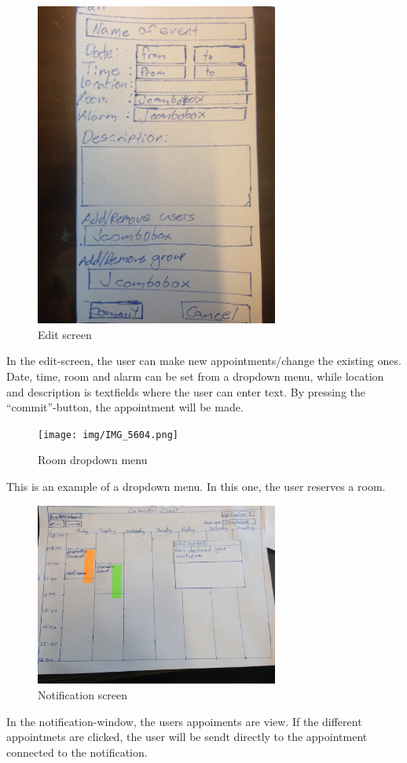 \documentclass{article}
\begin{document}
\begin{figure}[h!] 
    \begin{center} 
        \includegraphics[width=8cm]{img/IMG_5602.JPG}
        \caption{Edit screen}
    \label{edit}
    \end{center}
\end{figure}
In the edit-screen, the user can make new appointments/change the existing ones. Date, time, room and alarm can be set from a dropdown menu, while location and description is textfields where the user can enter text. By pressing the ``commit''-button, the appointment will be made.

\newpage

\begin{figure}[h!] 
    \begin{center} 
        \texttt{[image: img/IMG\_5604.png]}
        \caption{Room dropdown menu}
    \label{roomdropdown}
    \end{center}
\end{figure}
This is an example of a dropdown menu. In this one, the user reserves a room.

\newpage

\begin{figure}[h!] 
    \begin{center} 
        \includegraphics[width=8cm]{img/IMG_5608.JPG}
        \caption{Notification screen}
    \label{notificationscreen}
    \end{center}
\end{figure}
In the notification-window, the users appoiments are view. If the different appointmets are clicked, the user will be sendt directly to the appointment connected to the notification.
\end{document}
